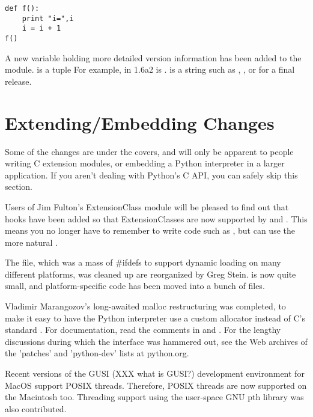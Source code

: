 \documentclass{howto}
\begin{document}
{{\begin{verbatim}
def f():
    print "i=",i
    i = i + 1 
f()
\end{verbatim}

A new variable holding more detailed version information has been
added to the  module.   is a tuple
 For example, in 1.6a2  is
.   is a string such as
, , or  for a final release.

\section{Extending/Embedding Changes}

Some of the changes are under the covers, and will only be apparent to
people writing C extension modules, or embedding a Python interpreter
in a larger application.  If you aren't dealing with Python's C API,
you can safely skip this section.

Users of Jim Fulton's ExtensionClass module will be pleased to find
out that hooks have been added so that ExtensionClasses are now
supported by  and .
This means you no longer have to remember to write code such as
, but can use the more natural
.

The  file, which was a mass of #ifdefs to
support dynamic loading on many different platforms, was cleaned up
are reorganized by Greg Stein.   is now quite small,
and platform-specific code has been moved into a bunch of
 files.  

Vladimir Marangozov's long-awaited malloc restructuring was completed,
to make it easy to have the Python interpreter use a custom allocator
instead of C's standard .  For documentation, read
the comments in  and
.  For the lengthy discussions during which
the interface was hammered out, see the Web archives of the 'patches'
and 'python-dev' lists at python.org.

Recent versions of the GUSI (XXX what is GUSI?)
development environment for MacOS support POSIX threads.  Therefore,
POSIX threads are now supported on the Macintosh too.  Threading
support using the user-space GNU pth library was also contributed.

}}
\end{document}
